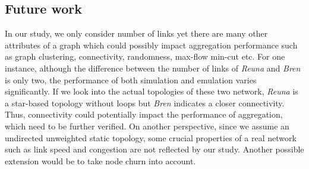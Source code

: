 \subsection{Future work}
In our study, we only consider number of links yet there are many other attributes of a graph which could possibly impact aggregation performance such as graph clustering\cite{Schaeffer200727}, connectivity, randomness, max-flow min-cut etc. For one instance, although the difference between the number of links of {\it Reuna} and {\it Bren} is only two, the performance of both simulation and emulation varies significantly. If we look into the actual topologies of these two network, {\it Reuna} is a star-based topology without loops but {\it Bren} indicates a closer connectivity. Thus, connectivity could potentially impact the performance of aggregation, which need to be further verified.
On another perspective, since we assume an undirected unweighted static topology, some crucial properties of a real network such as link speed and congestion are not reflected by our study. Another possible extension would be to take node churn into account.

